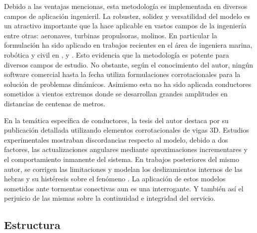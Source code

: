 Debido a las ventajas mencionas, esta metodología es implementada en diversos campos de aplicación ingenieril. La robustez, solidez y versatilidad del modelo es un atractivo importante que la hace aplicable en vastos campos de la ingeniería entre otras: aeronaves, turbinas propulsoras, molinos. En particular la formulación \citep{Le2014}  ha sido aplicado en trabajos recientes en el área de ingeniera marina, robótica y civil en \citep{albino2018co}, \cite{asadi2019multibody} y \cite{viana2020formulation}. Esto evidencia que la metodología es potente para diversos campos de estudio. No obstante, según el conocimiento del autor, ningún software comercial hasta la fecha utiliza formulaciones corrotacionales para la solución de problemas dinámicos. Asimismo esta no ha sido aplicada conductores sometidos a vientos extremos donde se desarrollan grandes amplitudes en distancias de centenas de metros.

En la temática específica de conductores, la tesis del autor \citet{foti2013corotational} destaca por su publicación detallada utilizando elementos corrotacionales de vigas 3D. Estudios experimentales mostraban discordancias respecto al modelo, debido a dos factores, las actualizaciones angulares mediante aproximaciones incrementares y el comportamiento inmanente del sistema. En trabajos posteriores del mismo autor, se corrigen las limitaciones y modelan los deslizamientos internos de las hebras y su histéresis sobre el fenómeno \citet{foti2018finite}. La aplicación de estos modelos sometidos ante tormentas conectivas aun es una interrogante. Y también así el perjuicio de las mismas sobre la continuidad e integridad del servicio. 

\subsection{Estructura}

